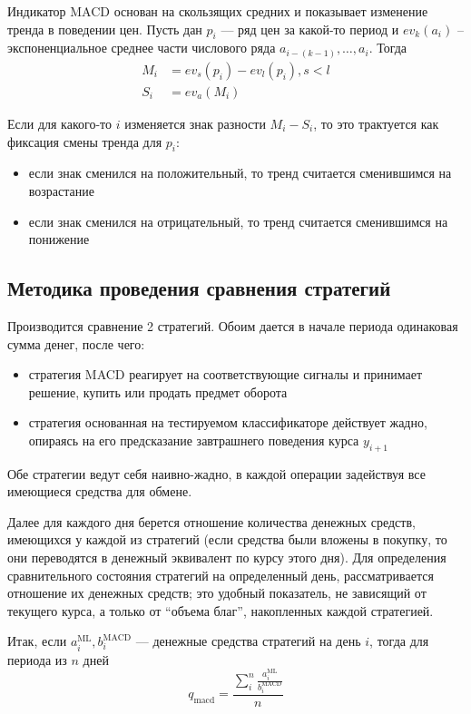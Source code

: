 \documentclass[pdftex,ptm,14pt,a4paper]{report}
\begin{document}
Индикатор MACD\cite{macd} основан на скользящих средних и показывает изменение тренда в поведении цен. Пусть дан $p_i$ ---
ряд цен за какой-то период и $ev_k(a_i)$ -- экспоненциальное среднее части числового ряда $a_{i-(k-1)},\ldots,a_i$. Тогда
\begin{equation}
\begin{split}
M_i &= ev_s(p_i) - ev_l(p_i), s < l \\
S_i &= ev_a(M_i)
\end{split}
\end{equation}

Если для какого-то $i$ изменяется знак разности $M_i - S_i$, то это трактуется как фиксация смены тренда для $p_i$:
\begin{itemize}
\item если знак сменился на положительный, то тренд считается сменившимся на возрастание
\item если знак сменился на отрицательный, то тренд считается сменившимся на понижение
\end{itemize}

\subsection{Методика проведения сравнения стратегий}

Производится сравнение 2 стратегий. Обоим дается в начале периода одинаковая сумма денег, после чего:
\begin{itemize}
\item стратегия MACD реагирует на соответствующие сигналы и принимает решение, купить или продать предмет оборота
\item стратегия основанная на тестируемом классификаторе действует жадно, опираясь на его предсказание завтрашнего
поведения курса $y_{i+1}$
\end{itemize}
Обе стратегии ведут себя наивно-жадно, в каждой операции задействуя все имеющиеся средства для обмене.

Далее для каждого дня берется отношение количества денежных средств, имеющихся у каждой из стратегий (если средства были
вложены в покупку, то они переводятся в денежный эквивалент по курсу этого дня). Для определения сравнительного состояния
стратегий на определенный день, рассматривается отношение их денежных средств; это удобный показатель, не зависящий
от текущего курса, а только от ``объема благ'', накопленных каждой стратегией.

Итак, если $a^{\text{ML}}_i, b^{\text{MACD}}_i$ --- денежные средства стратегий на день $i$, тогда для периода из $n$ дней
\begin{equation}
q_\text{macd} = \frac{\sum_i^n \frac{a^{\text{ML}}_i}{b^{\text{MACD}}_i}}{n}
\end{equation}
\end{document}
